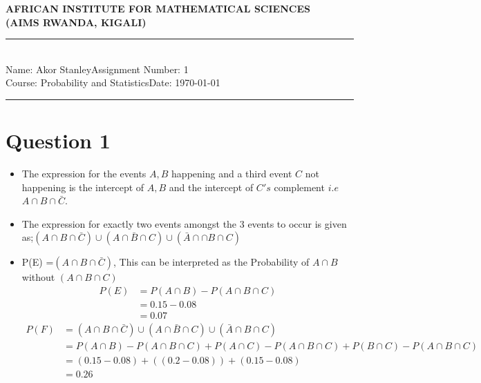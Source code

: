 \documentclass[12pt,a4paper]{article}
\newcommand{\student}{Akor Stanley}
\newcommand{\course}{Probability and Statistics}
\newcommand{\assignment}{1}
\begin{document}
\thispagestyle{empty}
\begin{center}
\textbf{AFRICAN INSTITUTE FOR MATHEMATICAL SCIENCES \\[0.5cm]
(AIMS RWANDA, KIGALI)}
\vspace{1.0cm}
\end{center}

\noindent
\rule{17cm}{0.2cm}\\[0.3cm]
Name: \student \hfill Assignment Number: \assignment\\[0.1cm]
Course: \course \hfill Date: \today\\
\rule{17cm}{0.05cm}
\vspace{1.0cm}




\section*{Question 1}
\begin{itemize}
\item[(1)] The expression for the events $A,B$ happening and a third event $C$ not happening is the intercept of  $A,B$ and the intercept of $C's$ complement $i.e$ $A\cap B\cap \bar{C}$.

\item[(2)]The expression for exactly two events amongst the 3 events to occur is given as;\quad$\left( A\cap B \cap \bar{C} \right) \cup \left( A\cap \bar{B} \cap C \right) \cup \left(\bar{A} \cap \cap B \cap C\right) $ 

\item[(3)]
P(E) =$\left(A\cap B\cap \bar{C}\right)$, This can be interpreted as the Probability of $A \cap B$ without $\left(A\cap B \cap C\right)$\\
\begin{align*}
P(E)&=P\left(A \cap B \right) -P\left(A \cap B \cap C \right)\\
&=0.15-0.08\\
&=0.07
\end{align*}
\begin{align*}
P\left(F\right)&=\left( A\cap B \cap \bar{C} \right) \cup \left( A\cap \bar{B} \cap C \right) \cup \left(\bar{A} \cap B \cap C\right)\\
&=P\left(A \cap B \right) -P\left(A \cap B \cap C \right)+P\left(A \cap C \right) -P\left(A \cap B \cap C \right)+P\left(B \cap C\right) -P\left(A \cap B\cap C \right)\\
&=\left(0.15-0.08\right)+\left(\left(0.2-0.08\right)\right)+\left(0.15-0.08\right)\\
&=0.26
\end{align*}

\end{itemize}
\end{document}
